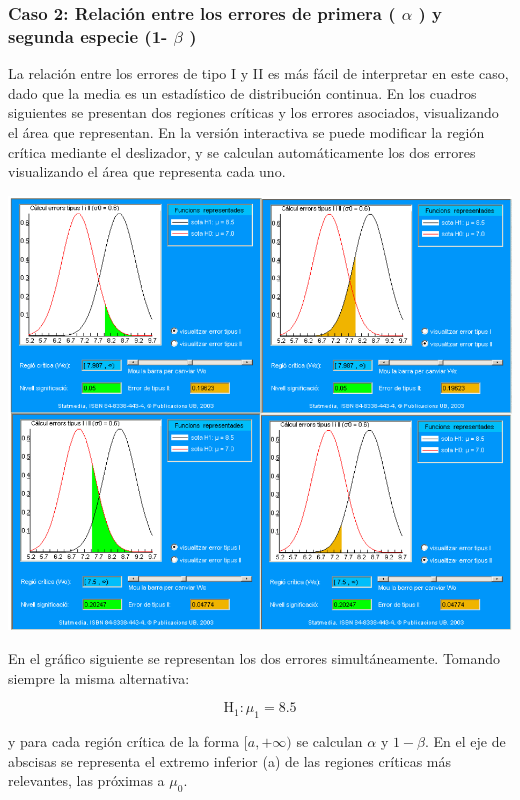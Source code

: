 \documentclass[
]{article}
\begin{document}
\subsubsection{\texorpdfstring{Caso 2: Relación entre los errores de primera ( \(\alpha\) ) y segunda especie (1- \(\beta\) )}{Caso 2: Relación entre los errores de primera ( \textbackslash alpha ) y segunda especie (1- \textbackslash beta )}}\label{caso-2-relaciuxf3n-entre-los-errores-de-primera-alpha-y-segunda-especie-1--beta}

La relación entre los errores de tipo I y II es más fácil de interpretar en este caso, dado que la media es un estadístico de distribución continua. En los cuadros siguientes se presentan dos regiones críticas y los errores asociados, visualizando el área que representan. En la versión interactiva se puede modificar la región crítica mediante el deslizador, y se calculan automáticamente los dos errores visualizando el área que representa cada uno.

\begin{center}\includegraphics[width=0.9\linewidth]{images/cap9-PlotProbsErrTipo_1_y_2} \end{center}

En el gráfico siguiente se representan los dos errores simultáneamente. Tomando siempre la misma alternativa:

\[
\mathrm{H}_{1}: \mu_{1}=8.5
\]

y para cada región crítica de la forma \([a,+\infty)\) se calculan \(\alpha\) y \(1-\beta\). En el eje de abscisas se representa el extremo inferior (a) de las regiones críticas más relevantes, las próximas a \(\mu_{0}\).
\end{document}
